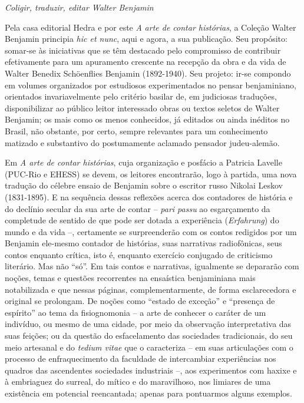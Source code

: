 \emph{Coligir, traduzir, editar Walter Benjamin}

Pela casa editorial Hedra e por este \emph{A} \emph{arte de contar
histórias}, a Coleção Walter Benjamin principia \emph{hic et nunc}, aqui
e agora, a sua publicação. Seu propósito: somar-se às iniciativas que se
têm destacado pelo compromisso de contribuir efetivamente para um
apuramento crescente na recepção da obra e da vida de Walter Benedix
Schöenflies Benjamin (1892-1940). Seu projeto: ir-se compondo em volumes
organizados por estudiosos experimentados no pensar benjaminiano,
orientados invariavelmente pelo critério basilar de, em judiciosas
traduções, disponibilizar ao público leitor interessado obras ou textos
seletos de Walter Benjamin; os mais como os menos conhecidos, já
editados ou ainda inéditos no Brasil, não obstante, por certo, sempre
relevantes para um conhecimento matizado e substantivo do postumamente
aclamado pensador judeu-alemão.

Em \emph{A arte de contar histórias}, cuja organização e posfácio a
Patricia Lavelle (PUC-Rio e EHESS) se devem, os leitores encontrarão,
logo à partida, uma nova tradução do célebre ensaio de Benjamin sobre o
escritor russo Nikolai Leskov (1831-1895). E na sequência dessas
reflexões acerca dos contadores de história e do declínio secular da sua
arte de contar -- \emph{pari passu} ao esgarçamento da completude de
sentido de que pode ser dotada a experiência (\emph{Erfahrung}) do mundo
e da vida --, certamente se surpreenderão com os contos redigidos por um
Benjamin ele-mesmo contador de histórias, suas narrativas radiofônicas,
seus contos enquanto crítica, isto é, enquanto exercício conjugado de
criticismo literário. Mas não ``só''. Em tais contos e narrativas,
igualmente se depararão com noções, temas e questões recorrentes na
ensaística benjaminiana mais notabilizada e que nessas páginas,
complementarmente, de forma esclarecedora e original se prolongam. De
noções como ``estado de exceção'' e ``presença de espírito'' ao tema da
fisiognomonia -- a arte de conhecer o caráter de um indivíduo, ou mesmo
de uma cidade, por meio da observação interpretativa das suas feições;
ou da questão do esfacelamento das sociedades tradicionais, do seu meio
artesanal e do \emph{tedium vitae} que o caracteriza -- em suas
articulações com o processo de enfraquecimento da faculdade de
intercambiar experiências nos quadros das ascendentes sociedades
industriais --, aos experimentos com haxixe e à embriaguez do surreal,
do mítico e do maravilhoso, nos limiares de uma existência em potencial
reencantada; apenas para pontuarmos alguns exemplos.

